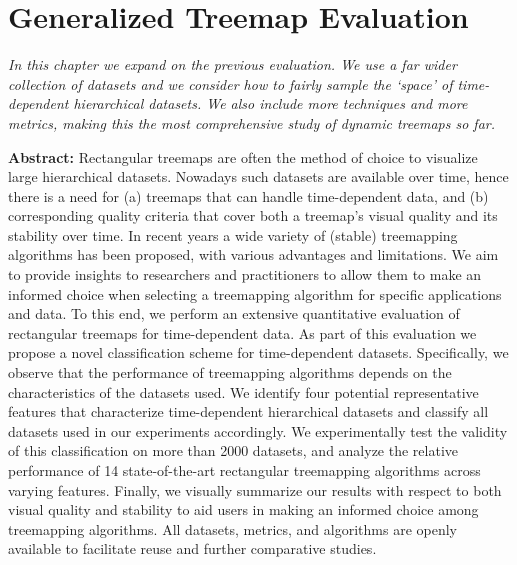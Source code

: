 \chapter{Generalized Treemap Evaluation}
\label{ch:tree-eval}

\newcommand{\mypar}[1]{\smallskip\noindent{\bfseries #1.}}




\textit{
In this chapter we expand on the previous evaluation. We use a far wider collection of datasets and we consider how to fairly sample the `space' of time-dependent hierarchical datasets. We also include more techniques and more metrics, making this the most comprehensive study of dynamic treemaps so far.
}

\vspace{5mm} %


\noindent \textbf{Abstract:}
Rectangular treemaps are often the method of choice to visualize large hierarchical datasets. Nowadays such datasets are available over time, hence there is a need for (a) treemaps that can handle time-dependent data, and (b) corresponding quality criteria that cover both a treemap's visual quality and its stability over time.
%
In recent years a wide variety of (stable) treemapping algorithms has been proposed, with various advantages and limitations. 
We aim to provide insights to researchers and practitioners to allow them to make an informed choice when selecting a treemapping algorithm for specific applications and data. To this end, we perform an extensive quantitative evaluation of rectangular treemaps for time-dependent data.
%
As part of this evaluation we propose a novel classification scheme for time-dependent datasets. Specifically, we observe that the performance of treemapping algorithms depends on the characteristics of the datasets used. We identify four potential representative features that characterize time-dependent hierarchical datasets and classify all datasets used in our experiments accordingly. We experimentally test the validity of this classification on more than 2000 datasets, and analyze the relative performance of 14 state-of-the-art rectangular treemapping algorithms across varying features. Finally, we visually summarize our results with respect to both visual quality and stability to aid users in making an informed choice among treemapping algorithms.
All datasets, metrics, and algorithms are openly available to facilitate reuse and further comparative studies.

